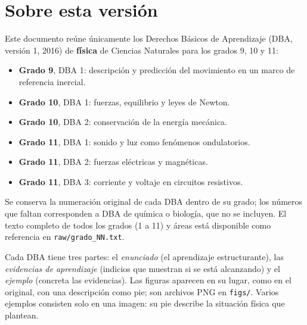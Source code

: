 \section{Sobre esta versión}\label{sec:intro}

Este documento reúne únicamente los Derechos Básicos de Aprendizaje (DBA, versión 1, 2016)
de \textbf{física} de Ciencias Naturales para los grados 9, 10 y 11:

\begin{itemize}[nosep]
  \item \textbf{Grado 9}, DBA 1: descripción y predicción del movimiento en un marco de referencia inercial.
  \item \textbf{Grado 10}, DBA 1: fuerzas, equilibrio y leyes de Newton.
  \item \textbf{Grado 10}, DBA 2: conservación de la energía mecánica.
  \item \textbf{Grado 11}, DBA 1: sonido y luz como fenómenos ondulatorios.
  \item \textbf{Grado 11}, DBA 2: fuerzas eléctricas y magnéticas.
  \item \textbf{Grado 11}, DBA 3: corriente y voltaje en circuitos resistivos.
\end{itemize}

Se conserva la numeración original de cada DBA dentro de su grado; los números que faltan
corresponden a DBA de química o biología, que no se incluyen. El texto completo de todos los
grados (1 a 11) y áreas está disponible como referencia en \texttt{raw/grado\_NN.txt}.

Cada DBA tiene tres partes: el \emph{enunciado} (el aprendizaje estructurante), las
\emph{evidencias de aprendizaje} (indicios que muestran si se está alcanzando) y el
\emph{ejemplo} (concreta las evidencias). Las figuras aparecen en su lugar, como en el
original, con una descripción como pie; son archivos PNG en \texttt{figs/}. Varios ejemplos
consisten solo en una imagen: su pie describe la situación física que plantean.

